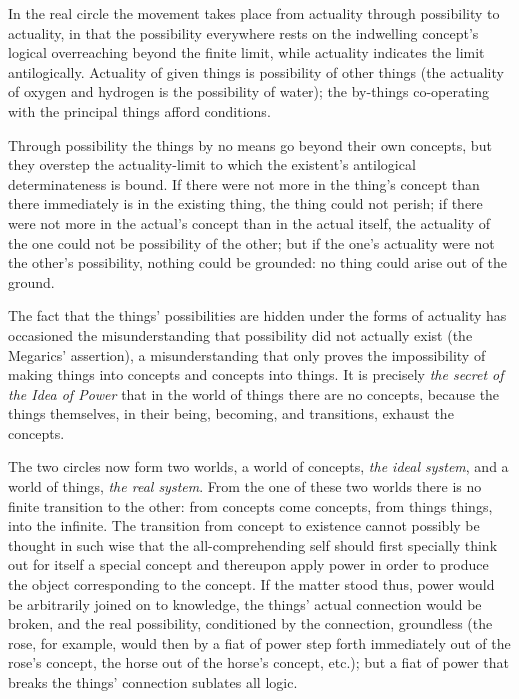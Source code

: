 \documentclass[12pt]{book}
\begin{document}
In the real circle the movement takes place from actuality through
possibility to actuality, in that the possibility everywhere rests
on the indwelling concept's logical overreaching beyond the finite
limit, while actuality indicates the limit antilogically. Actuality
of given things is possibility of other things (the actuality of
oxygen and hydrogen is the possibility of water); the by-things
co-operating with the principal things afford conditions.

Through possibility the things by no means go beyond their own
concepts, but they overstep the actuality-limit to which the
existent's antilogical determinateness is bound. If there were not
more in the thing's concept than there immediately is in the
existing thing, the thing could not perish; if there were not more
in the actual's concept than in the actual itself, the actuality of
the one could not be possibility of the other; but if the one's
actuality were not the other's possibility, nothing could be
grounded: no thing could arise out of the ground.

The fact that the things' possibilities are hidden under the forms
of actuality has occasioned the misunderstanding that possibility
did not actually exist (the Megarics' assertion), a misunderstanding
that only proves the impossibility of making things into concepts
and concepts into things. It is precisely \emph{the secret of the
Idea of Power} that in the world of things there are no concepts,
because the things themselves, in their being, becoming, and
transitions, exhaust the concepts.

The two circles now form two worlds, a world of concepts, \emph{the
ideal system}, and a world of things, \emph{the real system}. From
the one of these two worlds there is no finite transition to the
other: from concepts come concepts, from things things, into the
infinite. The transition from concept to existence cannot possibly
be thought in such wise that the all-comprehending self should first
specially think out for itself a special concept and thereupon apply
power in order to produce the object corresponding to the concept.
If the matter stood thus, power would be arbitrarily joined on to
knowledge, the things' actual connection would be broken, and the
real possibility, conditioned by the connection, groundless (the
rose, for example, would then by a fiat of power step forth
immediately out of the rose's concept, the horse
out of the horse's concept, etc.); but a fiat of power that breaks
the things' connection sublates all logic.
\end{document}
